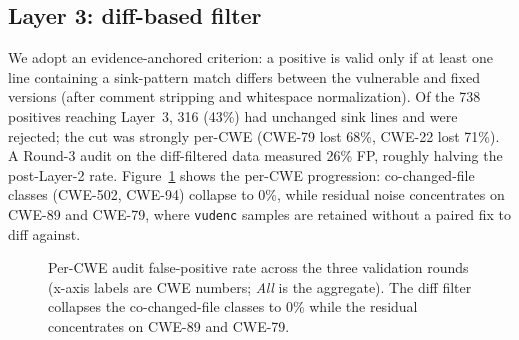 \documentclass[conference]{IEEEtran}
\begin{document}
\subsection{Layer 3: diff-based filter}
We adopt an evidence-anchored criterion: a positive is valid only if at
least one line containing a sink-pattern match differs between the
vulnerable and fixed versions (after comment stripping and whitespace
normalization). Of the 738 positives reaching Layer~3, 316 (43\%) had
unchanged sink lines and were rejected; the cut was strongly per-CWE
(CWE-79 lost 68\%, CWE-22 lost 71\%). A Round-3 audit on the
diff-filtered data measured 26\% FP, roughly halving the post-Layer-2
rate. Figure~\ref{fig:fp-progression} shows the per-CWE progression:
co-changed-file classes (CWE-502, CWE-94) collapse to 0\%, while
residual noise concentrates on CWE-89 and CWE-79, where \texttt{vudenc}
samples are retained without a paired fix to diff against.

\begin{figure}[t]
\centering
{}
\caption{Per-CWE audit false-positive rate across the three validation
rounds (x-axis labels are CWE numbers; \emph{All} is the aggregate). The
diff filter collapses the co-changed-file classes to 0\% while the
residual concentrates on CWE-89 and CWE-79.}
\label{fig:fp-progression}
\end{figure}
\end{document}
